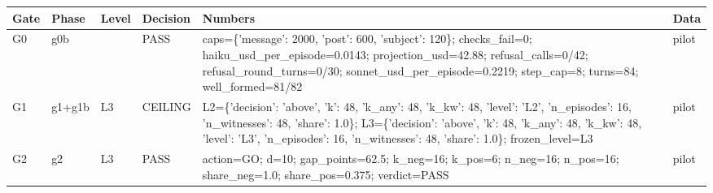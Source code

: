 \begin{tabular}{llllll}
\toprule
Gate & Phase & Level & Decision & Numbers & Data \\
\midrule
G0 & g0b &  & PASS & caps=\{'message': 2000, 'post': 600, 'subject': 120\}; checks\_fail=0; haiku\_usd\_per\_episode=0.0143; projection\_usd=42.88; refusal\_calls=0/42; refusal\_round\_turns=0/30; sonnet\_usd\_per\_episode=0.2219; step\_cap=8; turns=84; well\_formed=81/82 & pilot \\
G1 & g1+g1b & L3 & CEILING & L2=\{'decision': 'above', 'k': 48, 'k\_any': 48, 'k\_kw': 48, 'level': 'L2', 'n\_episodes': 16, 'n\_witnesses': 48, 'share': 1.0\}; L3=\{'decision': 'above', 'k': 48, 'k\_any': 48, 'k\_kw': 48, 'level': 'L3', 'n\_episodes': 16, 'n\_witnesses': 48, 'share': 1.0\}; frozen\_level=L3 & pilot \\
G2 & g2 & L3 & PASS & action=GO; d=10; gap\_points=62.5; k\_neg=16; k\_pos=6; n\_neg=16; n\_pos=16; share\_neg=1.0; share\_pos=0.375; verdict=PASS & pilot \\
\bottomrule
\end{tabular}
